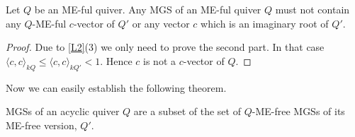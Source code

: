 \begin{lemma}
Let $Q$ be an ME-ful quiver. Any MGS of an ME-ful quiver $Q$ must not contain any $Q$-ME-ful $c$-vector of $Q'$ or any vector $c$ which is an imaginary root of $Q'$.
\end{lemma}
\begin{proof}
\indent Due to \ref{L2}(3) we only need to prove the second part. In that case $\langle c,c\rangle_{kQ} \leq \langle c,c\rangle_{kQ'} < 1$. Hence $c$ is not a $c$-vector of $Q$.
\end{proof}
\indent Now we can easily establish the following theorem.
\begin{theorem}
MGSs of an acyclic quiver $Q$ are a subset of the set of $Q$-ME-free MGSs of its ME-free version, $Q'$.\label{C4T1B}
\end{theorem}

